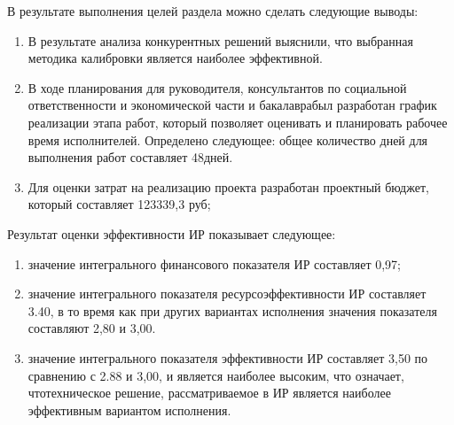 В результате выполнения целей раздела можно сделать следующие выводы:

\begin{enumerate}[wide]
\item В  результате  анализа  конкурентных  решений  выяснили,  что выбранная методика калибровки является наиболее эффективной.
\item В  ходе  планирования  для  руководителя,  консультантов  по социальной ответственности  и  экономической  части  и  бакалаврабыл разработан график реализации этапа работ, который позволяет оценивать и планировать  рабочее  время  исполнителей.  Определено  следующее:  общее количество дней для выполнения работ составляет 48дней.
\item Для  оценки  затрат  на  реализацию  проекта  разработан  проектный бюджет, который составляет 123339,3 руб;
\end{enumerate}

Результат оценки эффективности ИР показывает следующее:

\begin{enumerate}[wide]
\item значение интегрального финансового показателя ИР составляет 0,97;
\item значение  интегрального  показателя  ресурсоэффективности  ИР составляет 3.40, в то время как при других вариантах исполнения значения показателя составляют 2,80 и 3,00.
\item значение  интегрального  показателя  эффективности  ИР  составляет 3,50 по сравнению с 2.88 и 3,00, и является наиболее высоким, что означает, чтотехническое  решение,  рассматриваемое  в  ИР  является  наиболее эффективным вариантом исполнения.
\end{enumerate}